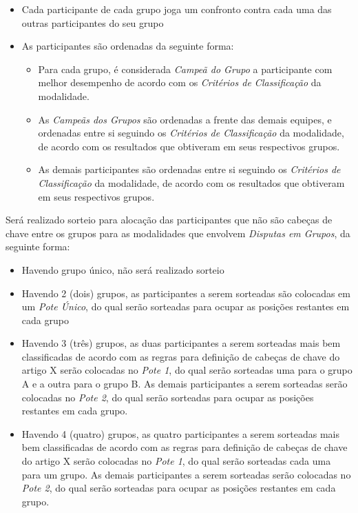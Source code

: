 \begin{itemize}[noitemsep]
	\item Cada participante de cada grupo joga um confronto contra cada uma das outras participantes do seu grupo
	\item As participantes são ordenadas da seguinte forma:
	\begin{itemize}[noitemsep]
		\item Para cada grupo, é considerada \textit{Campeã do Grupo} a participante com melhor desempenho de acordo com os \textit{Critérios de Classificação} da modalidade.
		\item As \textit{Campeãs dos Grupos} são ordenadas a frente das demais equipes, e ordenadas entre si seguindo os \textit{Critérios de Classificação} da modalidade, de acordo com os resultados que obtiveram em seus respectivos grupos.
		\item As demais participantes são ordenadas entre si seguindo os \textit{Critérios de Classificação} da modalidade, de acordo com os resultados que obtiveram em seus respectivos grupos.
	\end{itemize}
\end{itemize}

\noindent
Será realizado sorteio para alocação das participantes que não são cabeças de chave entre os grupos para as modalidades que envolvem \textit{Disputas em Grupos}, da seguinte forma:
\begin{itemize}[noitemsep]
	\item Havendo grupo único, não será realizado sorteio
	\item Havendo 2 (dois) grupos, as participantes a serem sorteadas são colocadas em um \textit{Pote Único}, do qual serão sorteadas para ocupar as posições restantes em cada grupo
	\item Havendo 3 (três) grupos, as duas participantes a serem sorteadas mais bem classificadas de acordo com as regras para definição de cabeças de chave do artigo X serão colocadas no \textit{Pote 1}, do qual serão sorteadas uma para o grupo A e a outra para o grupo B. As demais participantes a serem sorteadas serão colocadas no \textit{Pote 2}, do qual serão sorteadas para ocupar as posições restantes em cada grupo.
	\item Havendo 4 (quatro) grupos, as quatro participantes a serem sorteadas mais bem classificadas de acordo com as regras para definição de cabeças de chave do artigo X serão colocadas no \textit{Pote 1}, do qual serão sorteadas cada uma para um grupo. As demais participantes a serem sorteadas serão colocadas no \textit{Pote 2}, do qual serão sorteadas para ocupar as posições restantes em cada grupo.
\end{itemize}

